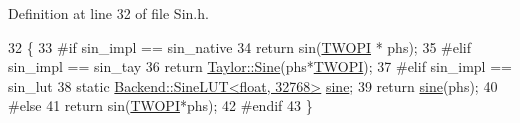 Definition at line 32 of file Sin.\+h.


\begin{DoxyCode}
32                                         \{
33 \textcolor{preprocessor}{#if sin\_impl == sin\_native}
34         \textcolor{keywordflow}{return} sin(\hyperlink{Sin_8h_a4912c64aec0c943b7985db6cb61ff83a}{TWOPI} * phs);
35 \textcolor{preprocessor}{#elif sin\_impl == sin\_tay}
36         \textcolor{keywordflow}{return} \hyperlink{namespaceBackend_1_1Backend_1_1Taylor_ad3bf02e59dbfb83f2b1362f84d2095b8}{Taylor::Sine}(phs*\hyperlink{Sin_8h_a4912c64aec0c943b7985db6cb61ff83a}{TWOPI});
37 \textcolor{preprocessor}{#elif sin\_impl == sin\_lut}
38         \textcolor{keyword}{static} \hyperlink{classBackend_1_1SineLUT}{Backend::SineLUT<float, 32768>} \hyperlink{namespaceSignal_1_1Fourier_ab1bf3cdef768a49cf3e927b9daf7da9d}{sine};
39         \textcolor{keywordflow}{return} \hyperlink{namespaceSignal_1_1Fourier_ab1bf3cdef768a49cf3e927b9daf7da9d}{sine}(phs);
40 \textcolor{preprocessor}{#else}
41         \textcolor{keywordflow}{return} sin(\hyperlink{Sin_8h_a4912c64aec0c943b7985db6cb61ff83a}{TWOPI}*phs);
42 \textcolor{preprocessor}{#endif}
43     \}
\end{DoxyCode}

